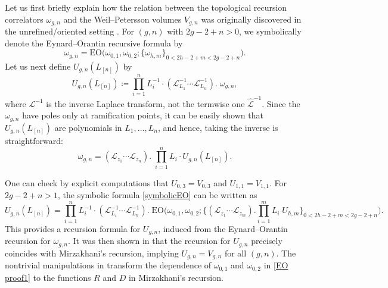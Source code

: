 \documentclass[12pt]{amsart}
\theoremstyle{plain}
\theoremstyle{definition}
\theoremstyle{remark}
\numberwithin{equation}{section}
\begin{document}
Let us first briefly explain how the relation between the topological recursion correlators $\omega_{g,n}$ and the Weil--Petersson volumes $V_{g,n}$ was originally discovered in the unrefined/oriented setting \cite{EO07-2}. 
For $(g,n)$ with $2g-2+n>0$, we symbolically denote the Eynard--Orantin recursive formula by
\begin{equation}
    \omega_{g,n}=\text{EO}\Big(\omega_{0,1},\omega_{0,2};\{\omega_{h,m}\}_{0<2h-2+m<2g-2+n}\Big).\label{symbolicEO}
\end{equation}
Let us next define $U_{g,n}(L_{[n]})$ by
\[U_{g,n}(L_{[n]})\coloneqq \prod_{i=1}^nL_i^{-1}\cdot(\mathcal{L}_{L_1}^{-1}\cdots \mathcal{L}_{L_n}^{-1}).\;\omega_{g,n},\]
where $\mathcal{L}^{-1}$ is the inverse Laplace transform, not the termwise one $\hat{\mathcal{L}}^{-1}$. Since the $\omega_{g,n}$ have poles only at ramification points, it can be easily shown that $U_{g,n}(L_{[n]})$ are polynomials in $L_1,...,L_n$, and hence, taking the inverse is straightforward:
\[\omega_{g,n}=(\mathcal{L}_{z_1}\cdots\mathcal{L}_{z_n}).\;\prod_{i=1}^n L_i\cdot U_{g,n}(L_{[n]}).\]

One can check by explicit computations that $U_{0,3}=V_{0,3}$ and $U_{1,1}=V_{1,1}$. For $2g-2+n>1$, the symbolic formula \eqref{symbolicEO} can be written as
\begin{equation}
  U_{g,n}(L_{[n]})=  \prod_{i=1}^nL_i^{-1}\cdot(\mathcal{L}^{-1}_{L_i}\cdots\mathcal{L}^{-1}_{L_n}).\;\text{EO}\Big(\omega_{0,1},\omega_{0,2};\{(\mathcal{L}_{z_1}\cdots\mathcal{L}_{z_m}).\prod_{i=1}^mL_i\;U_{h,m}\}_{0<2h-2+m<2g-2+n}\Big).\label{EO proof1}
\end{equation}
This provides a recursion formula for $U_{g,n}$, induced from the Eynard--Orantin recursion for $\omega_{g,n}$. It was then shown in \cite{EO07-2} that the recursion for $U_{g,n}$ precisely coincides with Mirzakhani's recursion, implying $U_{g,n}=V_{g,n}$ for all $(g,n)$. The nontrivial manipulations in \cite{EO07-2} transform the dependence of $\omega_{0,1}$ and $\omega_{0,2}$ in \eqref{EO proof1} to the functions $R$ and $D$ in Mirzakhani's recursion.
\end{document}
